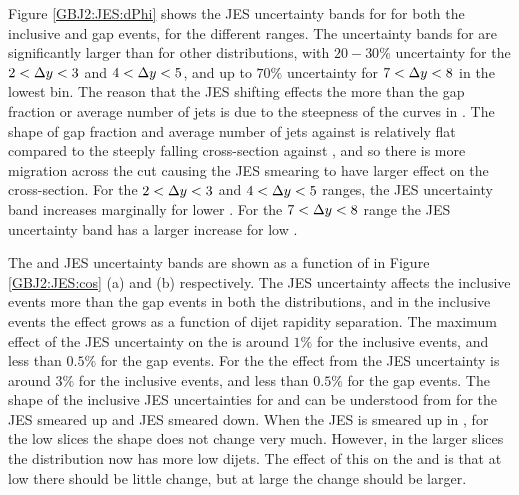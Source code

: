 Figure \ref{GBJ2:JES:dPhi} shows the JES uncertainty bands for \dphiDist{} for both the inclusive and gap events, for the different \dy{} ranges.
The uncertainty bands for \dphiDist{} are significantly larger than for other distributions, with $20-30\%$ uncertainty for the $2<\mbox{$\Delta y$}{}<3$ and $4<\mbox{$\Delta y$}{}<5$, and up to $70\%$ uncertainty for $7<\mbox{$\Delta y$}{}<8$ in the lowest \dphi{} bin.
The reason that the JES shifting effects the \dphiDist{} more than the gap fraction or average number of jets is due to the steepness of the curves in \ptb{}.
The shape of gap fraction and average number of jets against \ptb{} is relatively flat compared to the steeply falling cross-section against \ptb{}, and so there is more migration across the \pt{} cut causing the JES smearing to have larger effect on the cross-section. 
For the $2<\mbox{$\Delta y$}{}<3$ and $4<\mbox{$\Delta y$}{}<5$ ranges, the JES uncertainty band increases marginally for lower \dphi{}.
For the $7<\mbox{$\Delta y$}{}<8$ range the JES uncertainty band has a larger increase for low \dphi{}.

The \mean{\cosdphi{}} and \mean{\costwodphi{}} JES uncertainty bands are shown as a function of \dy{} in Figure \ref{GBJ2:JES:cos} (a) and (b) respectively. 
The JES uncertainty affects the inclusive events more than the gap events in both the distributions, and in the inclusive events the effect grows as a function of dijet rapidity separation.
The maximum effect of the JES uncertainty on the \mean{\cosdphi{}} is around $1\%$ for the inclusive events, and less than $0.5\%$ for the gap events.
For the \mean{\costwodphi{}} the effect from the JES uncertainty is around $3\%$ for the inclusive events, and less than $0.5\%$ for the gap events. 
The shape of the inclusive JES uncertainties for \mean{\cosdphi{}} and \mean{\costwodphi{}} can be understood from \dphiDist{} for the JES smeared up and JES smeared down. 
When the JES is smeared up in \dphiDist{}, for the low \dy{} slices the shape does not change very much.
However, in the larger \dy{} slices the distribution now has more low \dphi{} dijets.
The effect of this on the \mean{\cosdphi{}} and \mean{\costwodphi{}} is that at low \dy{} there should be little change, but at large \dy{} the change should be larger.


